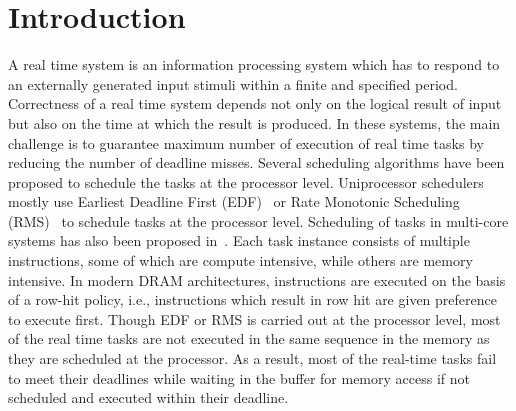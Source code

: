 \section{Introduction}
\noindent
A real time system is an information processing system which has to respond to an externally generated input stimuli within 
a finite and specified period. Correctness of a real time system depends not only on the logical result of input but also on 
the time at which the result is produced. In these systems, the main challenge is to guarantee maximum number of execution
of real time tasks by reducing the number of deadline misses. Several scheduling algorithms have been proposed to schedule the 
tasks at the processor level. Uniprocessor schedulers mostly use Earliest Deadline First (EDF)~\cite{wiki:xxx2} or Rate 
Monotonic Scheduling (RMS)~\cite{wiki:xxx3} to schedule tasks at the processor level. Scheduling of tasks in multi-core 
systems has also been proposed in~\cite{Giannopoulou:2013:SMA:2555754.2555771}. 
Each task instance consists of multiple instructions, some of which are compute intensive, while others are memory intensive. 
In modern DRAM architectures, instructions are executed on the basis of a row-hit policy, i.e., instructions which result in 
row hit are given preference to execute first. Though 
EDF or RMS is carried out at the processor level, most of the real time tasks are not executed in the same sequence in the 
memory as they are scheduled at the processor. As a result, most of the real-time tasks fail to meet their deadlines while
waiting in the buffer for memory access if not scheduled and executed within their deadline.

